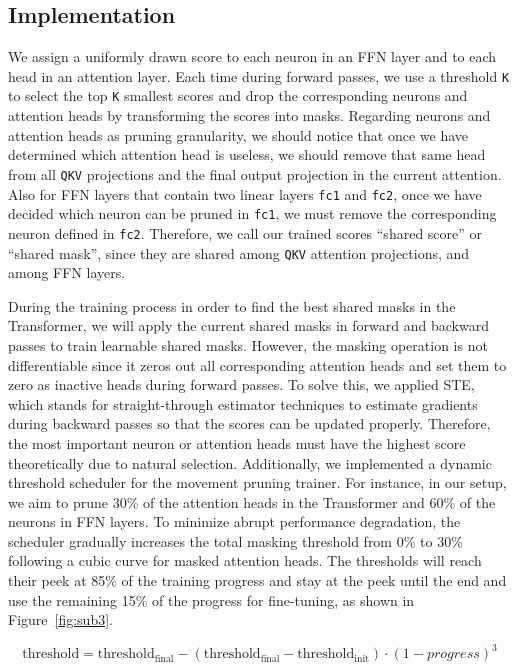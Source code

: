 \documentclass{article}
\begin{document}
    \subsection{Implementation}
    \hspace*{1em} We assign a uniformly drawn score to each neuron in an FFN layer and to each head in an attention layer. Each time during forward passes, we use a threshold \texttt{K} to select the top \texttt{K} smallest scores and drop the corresponding neurons and attention heads by transforming the scores into masks. Regarding neurons and attention heads as pruning granularity, we should notice that once we have determined which attention head is useless, we should remove that same head from all \texttt{QKV} projections and the final output projection in the current attention. Also for FFN layers that contain two linear layers \texttt{fc1} and \texttt{fc2}, once we have decided which neuron can be pruned in \texttt{fc1}, we must remove the corresponding neuron defined in \texttt{fc2}.  Therefore, we call our trained scores ``shared score'' or ``shared mask'', since they are shared among \texttt{QKV} attention projections, and among FFN layers.

    \hspace*{1em} During the training process in order to find the best shared masks in the Transformer, we will apply the current shared masks in forward and backward passes to train learnable shared masks. However, the masking operation is not differentiable since it zeros out all corresponding attention heads and set them to zero as inactive heads during forward passes. To solve this, we applied STE, which stands for straight-through estimator techniques to estimate gradients during backward passes so that the scores can be updated properly. Therefore, the most important neuron or attention heads must have the highest score theoretically due to natural selection. Additionally, we implemented a dynamic threshold scheduler for the movement pruning trainer. For instance, in our setup, we aim to prune 30\% of the attention heads in the Transformer and 60\% of the neurons in FFN layers. To minimize abrupt performance degradation, the scheduler gradually increases the total masking threshold from 0\% to 30\% following a cubic curve for masked attention heads. The thresholds will reach their peek at 85\% of the training progress and stay at the peek until the end and use the remaining 15\% of the progress for fine-tuning, as shown in Figure~\ref{fig:sub3}.

    \begin{equation}
        \text{threshold} = \text{threshold}_{\text{final}} - \left( \text{threshold}_{\text{final}} - \text{threshold}_{\text{init}} \right) \cdot (1 - progress)^3
    \end{equation}
\end{document}
